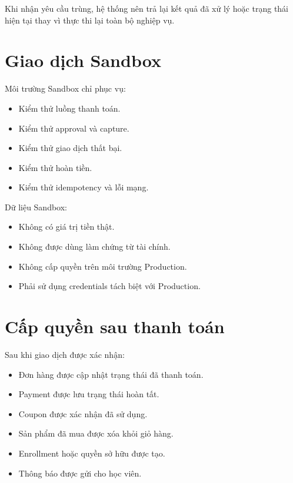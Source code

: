 \documentclass[12pt,a4paper]{article}
\begin{document}
Khi nhận yêu cầu trùng, hệ thống nên trả lại kết quả đã xử lý
hoặc trạng thái hiện tại thay vì thực thi lại toàn bộ nghiệp vụ.

\section{Giao dịch Sandbox}

Môi trường Sandbox chỉ phục vụ:

\begin{itemize}
    \item Kiểm thử luồng thanh toán.
    \item Kiểm thử approval và capture.
    \item Kiểm thử giao dịch thất bại.
    \item Kiểm thử hoàn tiền.
    \item Kiểm thử idempotency và lỗi mạng.
\end{itemize}

Dữ liệu Sandbox:

\begin{itemize}
    \item Không có giá trị tiền thật.
    \item Không được dùng làm chứng từ tài chính.
    \item Không cấp quyền trên môi trường Production.
    \item Phải sử dụng credentials tách biệt với Production.
\end{itemize}

\section{Cấp quyền sau thanh toán}

Sau khi giao dịch được xác nhận:

\begin{itemize}
    \item Đơn hàng được cập nhật trạng thái đã thanh toán.
    \item Payment được lưu trạng thái hoàn tất.
    \item Coupon được xác nhận đã sử dụng.
    \item Sản phẩm đã mua được xóa khỏi giỏ hàng.
    \item Enrollment hoặc quyền sở hữu được tạo.
    \item Thông báo được gửi cho học viên.
\end{itemize}
\end{document}
